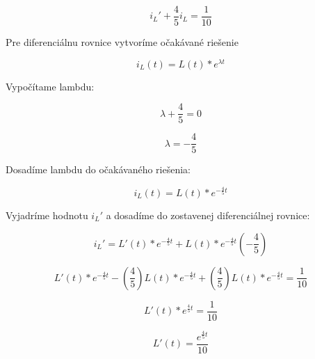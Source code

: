 \documentclass[a4paper,12pt]{article}
\begin{document}
\begin{equation*}
  i_L\prime + \frac{4}{5}i_L = \frac{1}{10}
\end{equation*}

\begin{flushleft}
Pre diferenciálnu rovnice vytvoríme očakávané riešenie
\end{flushleft}

\begin{equation*}
  i_L(t)=L(t)*e^{\lambda t}
\end{equation*}

\begin{flushleft}
Vypočítame lambdu: 
\end{flushleft}

\begin{equation*}
  \lambda + \frac{4}{5} = 0
\end{equation*}

\begin{equation*}
  \lambda = -\frac{4}{5} 
\end{equation*}

\begin{flushleft}
Dosadíme lambdu do očakávaného riešenia:  
\end{flushleft}

\begin{equation*}
  i_L(t)=L(t)*e^{-\frac{4}{5}t}
\end{equation*}

\begin{flushleft}
Vyjadríme hodnotu $i_L\prime $ a dosadíme do zostavenej diferenciálnej rovnice:  
\end{flushleft}

\begin{equation*}
  i_L\prime = L\prime (t)*e^{-\frac{4}{5}t} + L(t)*e^{-\frac{4}{5}t}(-\frac{4}{5})
\end{equation*}

\begin{equation*}
  L\prime (t)* e^{-\frac{4}{5}t} - (\frac{4}{5})L(t)*e^{-\frac{4}{5}t} + (\frac{4}{5})L(t)*e^{-\frac{4}{5}t} = \frac{1}{10}
\end{equation*}

\begin{equation*}
  L\prime (t)*e^{\frac{4}{5}t} = \frac{1}{10}
\end{equation*}

\begin{equation*}
  L\prime (t) = \frac{e^{\frac{4}{5}t}}{10}
\end{equation*}
\end{document}
